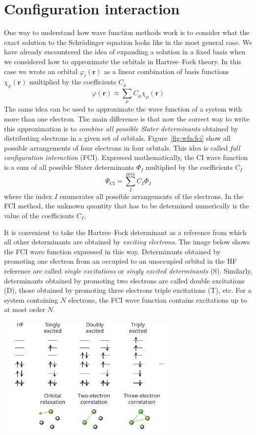 \documentclass[../Main/chem371-notes.tex]{subfiles}
\begin{document}
\section{Configuration interaction}



One way to understand how wave function methods work is to consider what the exact solution to the Schr\"{o}dinger equation looks like in the most general case.
We have already encountered the idea of expanding a solution in a fixed basis when we considered how to approximate the orbitals in Hartree--Fock theory.
In this case we wrote an orbital $\varphi_i(\mathbf{r})$ as a linear combination of basis functions $\chi_\mu(\mathbf{r})$ multiplied by the coefficients $C_{\mu}$
\begin{equation}
\varphi(\mathbf{r}) \approx \sum_\mu C_{\mu}\chi_\mu(\mathbf{r})
\end{equation}
The same idea can be used to approximate the wave function of a system with more than one electron.
The main difference is that now the correct way to write this approximation is to \emph{combine all possible Slater determinants} obtained by distributing electrons in a given set of orbitals.
Figure~\ref{fig:wfn:fci} show all possible arrangements of four electrons in four orbitals.
This idea is called \emph{full configuration interaction} (FCI). Expressed mathematically, the CI wave function is a sum of all possible Slater determinants $\Phi_I$ multiplied by the coefficients $C_I$
\begin{equation}
\Psi_\mathrm{CI} = \sum_I^{\text{dets}} C_I \Phi_I
\end{equation}
where the index $I$ enumerates all possible arrangements of the electrons.
In the FCI method, the unknown quantity that has to be determined numerically is the value of the coefficients $C_I$.

It is convenient to take the Hartree--Fock determinant as a reference from which all other determinants are obtained by \emph{exciting electrons}.
The image below shows the FCI wave function expressed in this way.
Determinants obtained by promoting one electron from an occupied to an unoccupied orbital in the HF reference are called \emph{single excitations} or \emph{singly excited determinants} (S).
Similarly, determinants obtained by promoting two electrons are called double excitations (D), those obtained by promoting three electrons triple excitations (T), etc.
For a system containing $N$ electrons, the FCI wave function contains excitations up to at most order $N$.
\begin{center}
\includegraphics[width=3.5in]{img/fci_expansion_simple.pdf}
\end{center}
\end{document}
